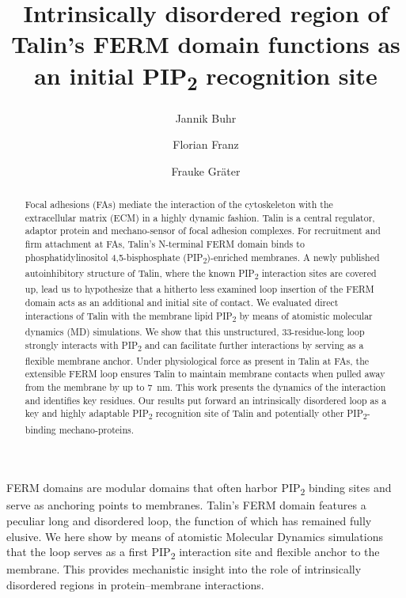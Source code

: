 \documentclass[
  twocolumn]{biophys-new-mod}
\title{Intrinsically disordered region of Talin's FERM domain functions
as an initial PIP\textsubscript{2} recognition site}
\author[1,2,*]
  {Jannik Buhr}
\author[1,2]
  {Florian Franz}
\author[1,2]
  {Frauke Gräter}
\affil[1]{Heidelberg Institute for Theoretical Studies}
\affil[2]{Interdisciplinary Center for Scientific Computing, Heidelberg
University}
\begin{document}
\begin{frontmatter}

\begin{abstract}
Focal adhesions (FAs) mediate the interaction of the cytoskeleton with
the extracellular matrix (ECM) in a highly dynamic fashion. Talin is a
central regulator, adaptor protein and mechano-sensor of focal adhesion
complexes. For recruitment and firm attachment at FAs, Talin's
N-terminal FERM domain binds to phosphatidylinositol 4,5-bisphosphate
(PIP\textsubscript{2})-enriched membranes. A newly published
autoinhibitory structure of Talin, where the known PIP\textsubscript{2}
interaction sites are covered up, lead us to hypothesize that a hitherto
less examined loop insertion of the FERM domain acts as an additional
and initial site of contact. We evaluated direct interactions of Talin
with the membrane lipid PIP\textsubscript{2} by means of atomistic
molecular dynamics (MD) simulations. We show that this unstructured,
33-residue-long loop strongly interacts with PIP\textsubscript{2} and
can facilitate further interactions by serving as a flexible membrane
anchor. Under physiological force as present in Talin at FAs, the
extensible FERM loop ensures Talin to maintain membrane contacts when
pulled away from the membrane by up to 7~nm. This work presents the
dynamics of the interaction and identifies key residues. Our results put
forward an intrinsically disordered loop as a key and highly adaptable
PIP\textsubscript{2} recognition site of Talin and potentially other
PIP\textsubscript{2}-binding mechano-proteins.
\end{abstract}


\begin{sigstatement}
FERM domains are modular domains that often harbor PIP\textsubscript{2}
binding sites and serve as anchoring points to membranes. Talin's FERM
domain features a peculiar long and disordered loop, the function of
which has remained fully elusive. We here show by means of atomistic
Molecular Dynamics simulations that the loop serves as a first
PIP\textsubscript{2} interaction site and flexible anchor to the
membrane. This provides mechanistic insight into the role of
intrinsically disordered regions in protein--membrane interactions.
\end{sigstatement}


\end{frontmatter}\ifdefined\Shaded\renewenvironment{Shaded}{\begin{tcolorbox}[breakable, frame hidden, sharp corners, enhanced, interior hidden, boxrule=0pt, borderline west={3pt}{0pt}{shadecolor}]}{\end{tcolorbox}}\fi
\end{document}
